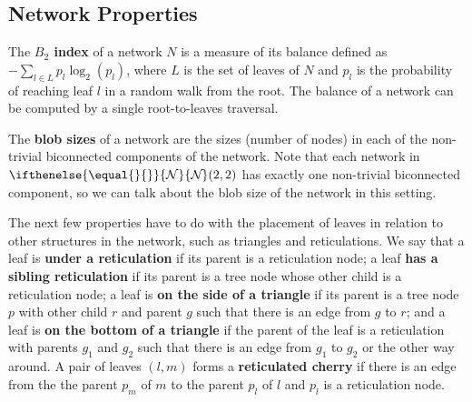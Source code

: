 \documentclass{article}
\theoremstyle{definition}
\newcommand{\N}[1][]{
\ifthenelse{\equal{#1}{}}{\mathcal{N}}{\mathcal{N}_{#1}}%
}
\begin{document}
\subsection{Network Properties}
The \textbf{$B_2$ index} of a network $N$ is a measure of its balance defined as $-\sum_{l\in L} p_l \log_2(p_l)$, where $L$ is the set of leaves of $N$ and $p_l$ is the probability of reaching leaf $l$ in a random walk from the root. \cite{bienvenu2021revisiting} The balance of a network can be computed by a single root-to-leaves traversal. 

The \textbf{blob sizes} of a network are the sizes (number of nodes) in each of the non-trivial biconnected components of the network. Note that each network in $\N(2,2)$ has exactly one non-trivial biconnected component, so we can talk about the blob size of the network in this setting.

The next few properties have to do with the placement of leaves in relation to other structures in the network, such as triangles and reticulations. We say that a leaf is \textbf{under a reticulation} if its parent is a reticulation node; a leaf \textbf{has a sibling reticulation} if its parent is a tree node whose other child is a reticulation node; a leaf is \textbf{on the side of a triangle} if its parent is a tree node $p$ with other child $r$ and parent $g$ such that there is an edge from $g$ to $r$; and a leaf is \textbf{on the bottom of a triangle} if the parent of the leaf is a reticulation with parents $g_1$ and $g_2$ such that there is an edge from $g_1$ to $g_2$ or the other way around. A pair of leaves $(l,m)$ forms a \textbf{reticulated cherry} if there is an edge from the the parent $p_m$ of $m$ to the parent $p_l$ of $l$ and $p_l$ is a reticulation node.  
\end{document}
